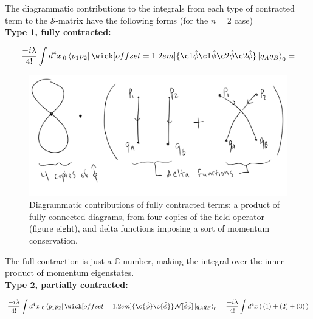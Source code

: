 \noindent The diagrammatic contributions to the integrals from each type of contracted term to the $\mathcal{S}$-matrix have the following forms (for the $n=2$ case) \\

\noindent \textbf{Type 1, fully contracted:} 

\begin{equation}
\frac{-i\lambda}{4!} \int d^4 x \,_0 \bra{p_1 p_2} \wick[offset=1.2em]{\c1 {\hat{\phi}} \c1 {\hat{\phi}} \c2 {\hat{\phi}} \c2 {\hat{\phi}} } \ket{q_A q_B}_0 =
\end{equation}
\begin{figure}[H]
	\centering
	\includegraphics[scale=0.4]{images/fullcont.png}
	\caption{Diagrammatic contributions of fully contracted terms: a product of fully connected diagrams, from four copies of the field operator (figure eight), and delta functions imposing a sort of momentum conservation.}
\end{figure}

\noindent The full contraction is just a $\mathbb{C}$ number, making the integral over the inner product of momentum eigenstates. \\

\noindent \textbf{Type 2, partially contracted:}

\begin{equation}
\frac{-i\lambda}{4!} \int d^4 x \,\,_0\bra{p_1 p_2} \wick[offset=1.2em]{\c {\hat{\phi}} \c {\hat{\phi}}} \,\mathcal{N}[\hat{\phi} \hat{\phi}] \ket{q_A q_B}_0 = \frac{-i\lambda}{4!} \int d^4 x \, ( \, (1) + (2) + (3) \, )
\end{equation}

